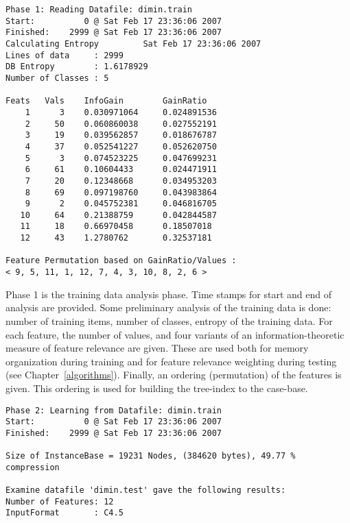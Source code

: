 \documentclass{report}
\begin{document}
{\footnotesize
\begin{verbatim}
Phase 1: Reading Datafile: dimin.train
Start:          0 @ Sat Feb 17 23:36:06 2007
Finished:    2999 @ Sat Feb 17 23:36:06 2007
Calculating Entropy         Sat Feb 17 23:36:06 2007
Lines of data     : 2999
DB Entropy        : 1.6178929
Number of Classes : 5

Feats   Vals    InfoGain        GainRatio
    1      3    0.030971064     0.024891536
    2     50    0.060860038     0.027552191
    3     19    0.039562857     0.018676787
    4     37    0.052541227     0.052620750
    5      3    0.074523225     0.047699231
    6     61    0.10604433      0.024471911
    7     20    0.12348668      0.034953203
    8     69    0.097198760     0.043983864
    9      2    0.045752381     0.046816705
   10     64    0.21388759      0.042844587
   11     18    0.66970458      0.18507018
   12     43    1.2780762       0.32537181

Feature Permutation based on GainRatio/Values :
< 9, 5, 11, 1, 12, 7, 4, 3, 10, 8, 2, 6 >
\end{verbatim}
}



Phase 1 is the training data analysis phase. Time stamps for start and
end of analysis are provided. Some preliminary analysis of the
training data is done: number of training items, number of classes,
entropy of the training data. For each feature, the number of values,
and four variants of an information-theoretic measure of feature
relevance are given. These are used both for memory organization
during training and for feature relevance weighting during testing
(see Chapter~\ref{algorithms}). Finally, an ordering (permutation) of
the features is given. This ordering is used for building the
tree-index to the case-base.




{\footnotesize
\begin{verbatim}
Phase 2: Learning from Datafile: dimin.train
Start:          0 @ Sat Feb 17 23:36:06 2007
Finished:    2999 @ Sat Feb 17 23:36:06 2007

Size of InstanceBase = 19231 Nodes, (384620 bytes), 49.77 % compression

Examine datafile 'dimin.test' gave the following results:
Number of Features: 12
InputFormat       : C4.5
\end{verbatim}
}
\end{document}
